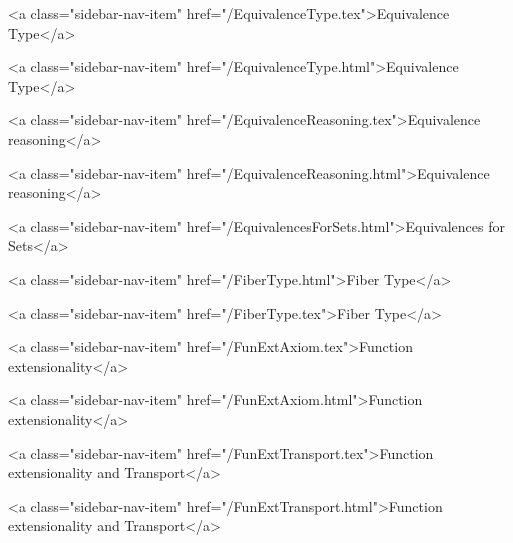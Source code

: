       
        
          <a class="sidebar-nav-item" href="/EquivalenceType.tex">Equivalence Type</a>
        
      
    
      
        
          <a class="sidebar-nav-item" href="/EquivalenceType.html">Equivalence Type</a>
        
      
    
      
        
          <a class="sidebar-nav-item" href="/EquivalenceReasoning.tex">Equivalence reasoning</a>
        
      
    
      
        
          <a class="sidebar-nav-item" href="/EquivalenceReasoning.html">Equivalence reasoning</a>
        
      
    
      
        
          <a class="sidebar-nav-item" href="/EquivalencesForSets.html">Equivalences for Sets</a>
        
      
    
      
        
          <a class="sidebar-nav-item" href="/FiberType.html">Fiber Type</a>
        
      
    
      
        
          <a class="sidebar-nav-item" href="/FiberType.tex">Fiber Type</a>
        
      
    
      
        
          <a class="sidebar-nav-item" href="/FunExtAxiom.tex">Function extensionality</a>
        
      
    
      
        
          <a class="sidebar-nav-item" href="/FunExtAxiom.html">Function extensionality</a>
        
      
    
      
        
          <a class="sidebar-nav-item" href="/FunExtTransport.tex">Function extensionality and Transport</a>
        
      
    
      
        
          <a class="sidebar-nav-item" href="/FunExtTransport.html">Function extensionality and Transport</a>
        
